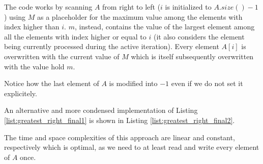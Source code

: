 

The code works by scanning $A$ from right to left ($i$ is initialized to $A.size()-1$) using $M$ as a placeholder for the maximum value among the elements with index higher than $i$. 
$m$, instead, contains the value of the largest element among all the elements with index higher or equal to $i$ (it also considers the element being currently processed during the active iteration). 
Every element $A[i]$ is overwritten with the current value of $M$ which is itself subsequently overwritten with the value hold $m$.

Notice how the last element of $A$ is modified into $-1$ even if we do not set it explicitely. 

An alternative and more condensed implementation of Listing \ref{list:greatest_right_final1} is shown in Listing \ref{list:greatest_right_final2}.



The time and space complexities of this approach are linear and constant, respectively which is optimal, as we need to at least read and write every element of $A$ once. 